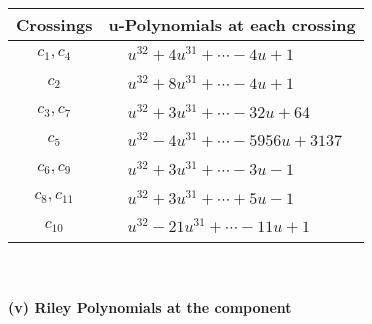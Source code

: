 \documentclass[1p]{elsarticle_modified}
\theoremstyle{definition}
\begin{document}
\begin{tabular}{m{50pt}|m{274pt}}
Crossings & \hspace{64pt}u-Polynomials at each crossing \\
\hline $$\begin{aligned}c_{1},c_{4}\end{aligned}$$&$\begin{aligned}
&u^{32}+4 u^{31}+\cdots-4 u+1
\end{aligned}$\\
\hline $$\begin{aligned}c_{2}\end{aligned}$$&$\begin{aligned}
&u^{32}+8 u^{31}+\cdots-4 u+1
\end{aligned}$\\
\hline $$\begin{aligned}c_{3},c_{7}\end{aligned}$$&$\begin{aligned}
&u^{32}+3 u^{31}+\cdots-32 u+64
\end{aligned}$\\
\hline $$\begin{aligned}c_{5}\end{aligned}$$&$\begin{aligned}
&u^{32}-4 u^{31}+\cdots-5956 u+3137
\end{aligned}$\\
\hline $$\begin{aligned}c_{6},c_{9}\end{aligned}$$&$\begin{aligned}
&u^{32}+3 u^{31}+\cdots-3 u-1
\end{aligned}$\\
\hline $$\begin{aligned}c_{8},c_{11}\end{aligned}$$&$\begin{aligned}
&u^{32}+3 u^{31}+\cdots+5 u-1
\end{aligned}$\\
\hline $$\begin{aligned}c_{10}\end{aligned}$$&$\begin{aligned}
&u^{32}-21 u^{31}+\cdots-11 u+1
\end{aligned}$\\
\hline
\end{tabular}\\~\\
\newpage\renewcommand{\arraystretch}{1}
\flushleft \textbf{(v) Riley Polynomials at the component}\newline \\
\end{document}

